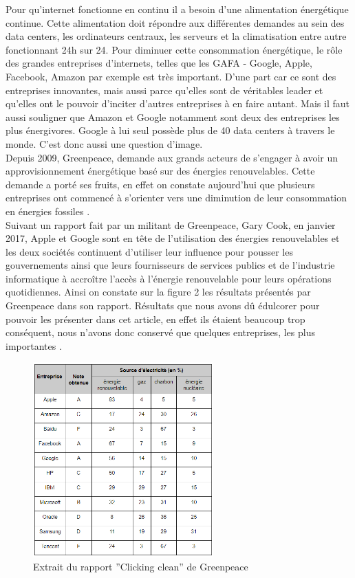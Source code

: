 \documentclass[a4paper,twocolumn,12pt]{article}
\begin{document}
	Pour qu’internet fonctionne en continu il a besoin d’une alimentation énergétique continue. Cette alimentation doit répondre aux différentes demandes au sein des data centers, les ordinateurs centraux, les serveurs et la climatisation entre autre fonctionnant 24h sur 24. Pour diminuer cette consommation énergétique, le rôle des grandes entreprises d’internets, telles que les GAFA - Google, Apple, Facebook, Amazon par exemple est très important. D’une part car ce sont des entreprises innovantes, mais aussi parce qu’elles sont de véritables leader et qu’elles ont le pouvoir d’inciter d’autres entreprises à en faire autant. Mais il faut aussi souligner que Amazon et Google notamment sont deux des entreprises les plus énergivores. Google à lui seul possède plus de 40 data centers à travers le monde. C’est donc aussi une question d’image. \\ 

	Depuis 2009, Greenpeace, demande aux grands acteurs de s’engager à avoir un approvisionnement énergétique basé sur des énergies renouvelables. Cette demande a porté ses fruits, en effet on constate aujourd’hui que plusieurs entreprises ont commencé à s’orienter vers une diminution de leur consommation en énergies fossiles \cite{3}. \\

	Suivant un rapport fait par un militant de Greenpeace, Gary Cook, en janvier 2017, Apple et Google sont en tête de l'utilisation des énergies renouvelables et les deux sociétés continuent d’utiliser leur influence pour pousser les gouvernements ainsi que leurs fournisseurs de services publics et de l’industrie informatique à accroître l'accès à l'énergie renouvelable pour leurs opérations quotidiennes. Ainsi on constate sur la figure 2 les résultats présentés par Greenpeace dans son rapport. Résultats que nous avons dû édulcorer pour pouvoir les présenter dans cet article, en effet ils étaient beaucoup trop conséquent, nous n’avons donc conservé que quelques entreprises, les plus importantes \cite{12}.
	
\begin{figure}[!h]	
\centerline{\includegraphics[height=7.5cm]{picture/tableauGreenpeace.png}}
\caption{Extrait du rapport ''Clicking clean'' de Greenpeace}
\label{tableauGreenpeace}
\end{figure}	
	
\end{document}
